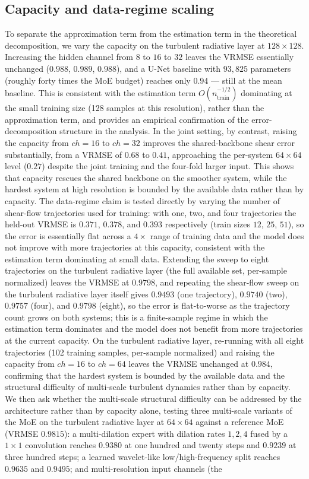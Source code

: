 \documentclass[preprint,12pt]{elsarticle}
\begin{document}
\subsection{Capacity and data-regime scaling}
To separate the approximation term from the estimation term in the theoretical decomposition, we vary the capacity on the turbulent radiative layer at $128\times128$. Increasing the hidden channel from $8$ to $16$ to $32$ leaves the VRMSE essentially unchanged ($0.988$, $0.989$, $0.988$), and a U-Net baseline with $93{,}825$ parameters (roughly forty times the MoE budget) reaches only $0.94$ --- still at the mean baseline. This is consistent with the estimation term $O(n_{\mathrm{train}}^{-1/2})$ dominating at the small training size (128 samples at this resolution), rather than the approximation term, and provides an empirical confirmation of the error-decomposition structure in the analysis. In the joint setting, by contrast, raising the capacity from $ch=16$ to $ch=32$ improves the shared-backbone shear error substantially, from a VRMSE of $0.68$ to $0.41$, approaching the per-system $64\times64$ level ($0.27$) despite the joint training and the four-fold larger input. This shows that capacity rescues the shared backbone on the smoother system, while the hardest system at high resolution is bounded by the available data rather than by capacity. The data-regime claim is tested directly by varying the number of shear-flow trajectories used for training: with one, two, and four trajectories the held-out VRMSE is $0.371$, $0.378$, and $0.393$ respectively (train sizes $12$, $25$, $51$), so the error is essentially flat across a $4\times$ range of training data and the model does not improve with more trajectories at this capacity, consistent with the estimation term dominating at small data. Extending the sweep to eight trajectories on the turbulent radiative layer (the full available set, per-sample normalized) leaves the VRMSE at $0.9798$, and repeating the shear-flow sweep on the turbulent radiative layer itself gives $0.9493$ (one trajectory), $0.9740$ (two), $0.9757$ (four), and $0.9798$ (eight), so the error is flat-to-worse as the trajectory count grows on both systems; this is a finite-sample regime in which the estimation term dominates and the model does not benefit from more trajectories at the current capacity. On the turbulent radiative layer, re-running with all eight trajectories (102 training samples, per-sample normalized) and raising the capacity from $ch=16$ to $ch=64$ leaves the VRMSE unchanged at $0.984$, confirming that the hardest system is bounded by the available data and the structural difficulty of multi-scale turbulent dynamics rather than by capacity. We then ask whether the multi-scale structural difficulty can be addressed by the architecture rather than by capacity alone, testing three multi-scale variants of the MoE on the turbulent radiative layer at $64\times64$ against a reference MoE (VRMSE $0.9815$): a multi-dilation expert with dilation rates $1,2,4$ fused by a $1\times1$ convolution reaches $0.9380$ at one hundred and twenty steps and $0.9239$ at three hundred steps; a learned wavelet-like low/high-frequency split reaches $0.9635$ and $0.9495$; and multi-resolution input channels (the 
\end{document}

